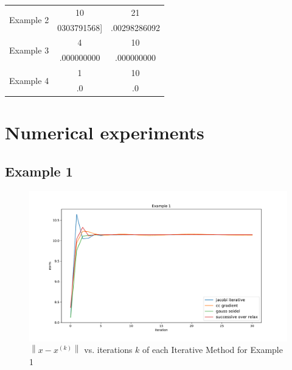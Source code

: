 \documentclass[11pt]{article}	%
\newcommand\norm[1]{\left\lVert#1\right\rVert}
\begin{document}
\begin{center}
	 \label{tab:title}
    \begin{tabular}{||c|c|c||}
        \hline
        \multirow{2}{5em}{Example 2} & 10 & 21 \\ [.25em]
        & 0303791568] & .00298286092\\ [.25em]
        \hline\hline
        \multirow{2}{5em}{Example 3} & 4 & 10 \\ [.25em]
        & .000000000 & .000000000 \\ [.25em]
        \hline
        \multirow{2}{5em}{Example 4} & 1 & 10 \\ [.25em]
        & .0 & .0 \\ [.25em]
        \hline
    \end{tabular}
\end{center}


\section{Numerical experiments}
\subsection{Example 1}
\begin{figure}[H]
\centering
\includegraphics[width=.9\textwidth]{1}
\caption{$\norm{x - x^{(k)}}$ vs. iterations $k$ of each Iterative Method for Example 1}
\label{fig:1}
\end{figure}
\end{document}
